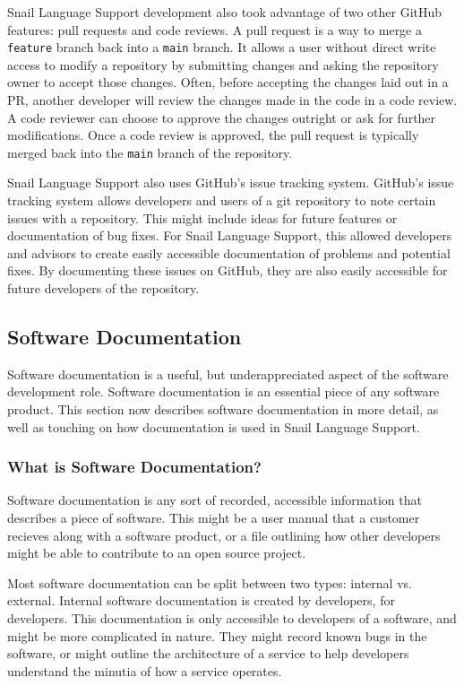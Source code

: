\documentclass{article}
\begin{document}
Snail Language Support development also took advantage of two other GitHub features: pull requests and code reviews. A pull request is a way to merge a \lstinline{feature} branch back into a \lstinline{main} branch. It allows a user without direct write access to modify a repository by submitting changes and asking the repository owner to accept those changes. Often, before accepting the changes laid out in a PR, another developer will review the changes made in the code in a code review. A code reviewer can choose to approve the changes outright or ask for further modifications. Once a code review is approved, the pull request is typically merged back into the \lstinline{main} branch of the repository. 

Snail Language Support also uses GitHub's issue tracking system. GitHub's issue tracking system allows developers and users of a git repository to note certain issues with a repository. This might include ideas for future features or documentation of bug fixes. For Snail Language Support, this allowed developers and advisors to create easily accessible documentation of problems and potential fixes. By documenting these issues on GitHub, they are also easily accessible for future developers of the repository. 

\subsection{Software Documentation}

Software documentation is a useful, but underappreciated aspect of the software development role. Software documentation is an essential piece of any software product. This section now describes software documentation in more detail, as well as touching on how documentation is used in Snail Language Support.

\subsubsection{What is Software Documentation?}

Software documentation is any sort of recorded, accessible information that describes a piece of software. This might be a user manual that a customer recieves along with a software product, or a file outlining how other developers might be able to contribute to an open source project. 

Most software documentation can be split between two types: internal vs. external. Internal software documentation is created by developers, for developers. This documentation is only accessible to developers of a software, and might be more complicated in nature. They might record known bugs in the software, or might outline the architecture of a service to help developers understand the minutia of how a service operates.
\end{document}
